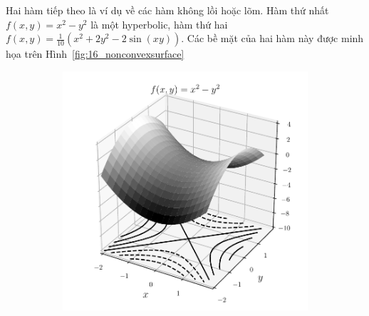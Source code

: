 Hai hàm tiếp theo là ví dụ về các hàm không lồi hoặc lõm. Hàm
thứ nhất $f(x, y) = x^2 - y^2$ là một hyperbolic, hàm thứ hai $f(x,y) =
\frac{1}{10}(x^2 + 2y^2 - 2\sin(xy)) $. Các bề mặt của hai hàm này được minh
họa trên Hình~\ref{fig:16_nonconvexsurface}



\begin{figure}[t]
\begin{subfigure}{0.48\textwidth}
\includegraphics[width=0.95\linewidth]{ebookML_src/src/convexity/hyperbol.pdf}
\end{subfigure}
\begin{subfigure}{0.48\textwidth}

\end{subfigure}
\end{figure}
